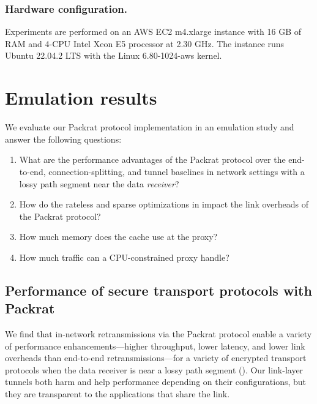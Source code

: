 \subsubsection{Hardware configuration.}

Experiments are performed on an AWS EC2 m4.xlarge instance with 16 GB of RAM
and 4-CPU Intel Xeon E5 processor at 2.30 GHz. The instance
runs Ubuntu 22.04.2 LTS with the Linux 6.80-1024-aws kernel.

\section{Emulation results}
\label{sec:packrat:emulation}

We evaluate our Packrat protocol implementation in an emulation study and answer
the following questions:
\begin{enumerate}[noitemsep]
    \item What are the performance advantages of the Packrat protocol over the
     end-to-end, connection-splitting, and tunnel baselines in network settings
     with a lossy path segment near the data \textit{receiver}?
    \item How do the rateless and sparse optimizations in
      impact the link overheads of the Packrat
     protocol?
    \item How much memory does the cache use at the proxy?
    \item How much traffic can a CPU-constrained proxy handle?
\end{enumerate}

\subsection{Performance of secure transport protocols with Packrat}
\label{sec:packrat:emulation:performance}

We find that
in-network retransmissions via the Packrat protocol enable a variety of performance
enhancements---higher throughput, lower latency, and lower link overheads than
end-to-end retransmissions---for a variety of encrypted transport protocols
when the data receiver is near a lossy path segment ().
Our link-layer tunnels both harm and help performance depending on their
configurations, but they are transparent to the applications that share the link.


